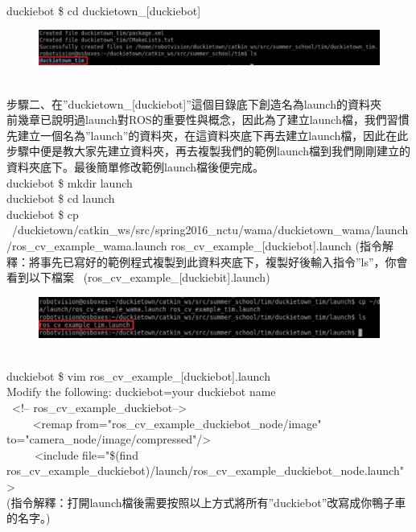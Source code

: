 \documentclass{article}
\begin{document}
\\duckiebot \$ cd duckietown\_[duckiebot]
\begin{figure}[htp]
    \begin{center}
        \includegraphics[width=400pt]{pic/5_2_2.png}
    \end{center}
\end{figure}
\\
步驟二、在”duckietown\_[duckiebot]”這個目錄底下創造名為launch的資料夾
\\前幾章已說明過launch對ROS的重要性與概念，因此為了建立launch檔，我們習慣先建立一個名為”launch”的資料夾，在這資料夾底下再去建立launch檔，因此在此步驟中便是教大家先建立資料夾，再去複製我們的範例launch檔到我們剛剛建立的資料夾底下。最後簡單修改範例launch檔後便完成。
\\duckiebot \$ mkdir launch
\\duckiebot \$ cd launch
\\duckiebot \$ cp ~/duckietown/catkin\_ws/src/spring2016\_nctu/wama/duckietown\_wama/launch/ros\_cv\_example\_wama.launch ros\_cv\_example\_[duckiebot].launch 
(指令解釋：將事先已寫好的範例程式複製到此資料夾底下，複製好後輸入指令”ls”，你會看到以下檔案  (ros\_cv\_example\_[duckiebit].launch)
\begin{figure}[htp]
    \begin{center}
        \includegraphics[width=400pt]{pic/5_2_3.png}
    \end{center}
\end{figure}
\\
duckiebot \$ vim ros\_cv\_example\_[duckiebot].launch
\\Modify the following: duckiebot=your duckiebot name
\\ <!-- ros\_cv\_example\_duckiebot-->
\\     <remap from="ros\_cv\_example\_duckiebot\_node/image" to="camera\_node/image/compressed"/>
\\     <include file="\$(find ros\_cv\_example\_duckiebot)/launch/ros\_cv\_example\_duckiebot\_node.launch">
\\(指令解釋：打開launch檔後需要按照以上方式將所有”duckiebot”改寫成你鴨子車的名字。)
\end{document}
